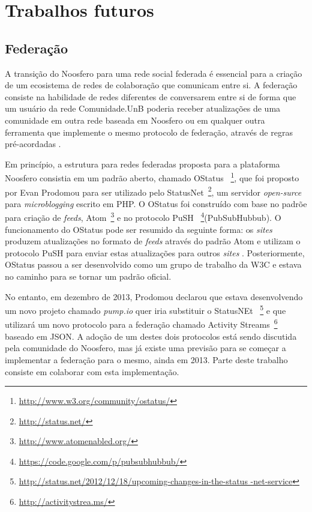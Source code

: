 \section{Trabalhos futuros}
\label{sec:future-works}


\subsection{Federação}

A transição do Noosfero para uma rede social federada é essencial para a criação
de um ecosistema de redes de colaboração que comunicam entre si. A federação
consiste na habilidade de redes diferentes de conversarem entre si de forma que
um usuário da rede Comunidade.UnB poderia receber atualizações de uma comunidade
em outra rede baseada em Noosfero ou em qualquer outra ferramenta que implemente
o mesmo protocolo de federação, através de regras pré-acordadas
\cite{prodomou2010}.

Em princípio, a estrutura para redes federadas proposta para a plataforma Noosfero
consistia em um padrão aberto, chamado OStatus
~\footnote{\url{http://www.w3.org/community/ostatus/}}, que foi proposto
por Evan Prodomou para ser utilizado pelo StatusNet~\footnote{\url{
http://status.net/}}, um servidor  \textit{open-surce} para
\textit{microblogging} escrito em PHP.
%
O OStatus foi construído com base no padrõe para criação de \textit{feeds},
Atom~\footnote{\url{http://www.atomenabled.org/}} e no protocolo PuSH
~\footnote{\url{https://code.google.com/p/pubsubhubbub/}}(PubSubHubbub).
O funcionamento do OStatus pode ser resumido da seguinte forma:
os \textit{sites} produzem atualizações no formato de \textit{feeds} através
do padrão Atom e utilizam o protocolo PuSH para enviar estas atualizações
para outros \textit{sites} \cite{OStatusBasics}.
%
Posteriormente, OStatus passou a ser desenvolvido como um grupo de trabalho
da W3C e estava no caminho para se tornar um padrão oficial. 

No entanto, em dezembro de 2013, Prodomou declarou que estava desenvolvendo
um novo projeto chamado \textit{pump.io} quer iria substituir o StatusNEt
~\footnote{\url{http://status.net/2012/12/18/upcoming-changes-in-the-status
-net-service}} e que utilizará um novo protocolo para a federação chamado
Activity Streams~\footnote{\url{http://activitystrea.ms/}} baseado em JSON.
A adoção de um destes dois protocolos está sendo discutida pela comunidade do
Noosfero, mas já existe uma previsão para se começar a implementar a federação
para o mesmo, ainda em 2013. Parte deste trabalho consiste em colaborar com esta
implementação.

